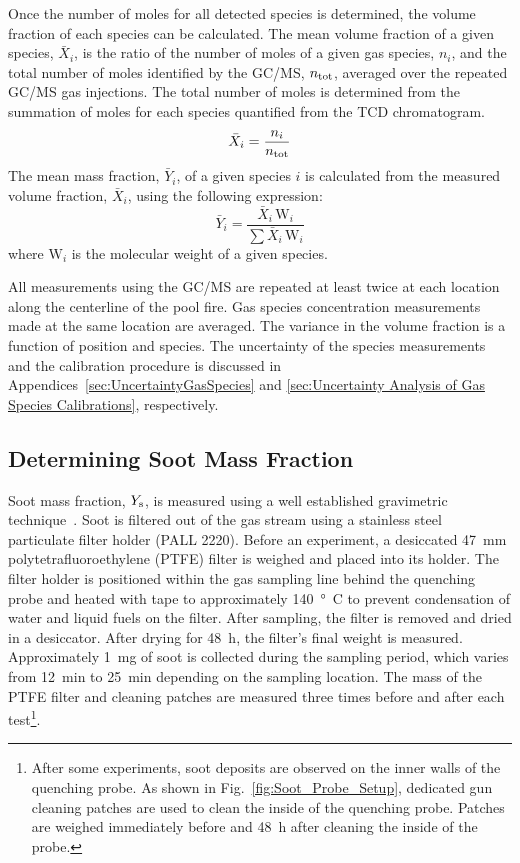 \documentclass[12pt]{article}
\begin{document}
Once the number of moles for all detected species is determined, the volume fraction of each species can be calculated. The mean volume fraction of a given species, $\bar{X}_{i}$, is the ratio of the number of moles of a given gas species, $n_{i}$, and the total number of moles identified by the GC/MS, $n_{\rm tot}$, averaged over the repeated GC/MS gas injections. The total number of moles is determined from the summation of moles for each species quantified from the TCD chromatogram.
\begin{equation}\label{eq:volume_fraction}
  	\bar{X}_{i}= \frac{n_{i}}{n_{\rm tot}}
\end{equation}
The mean mass fraction, $\bar{Y}_{i}$, of a given species $i$ is calculated from the measured volume fraction, $\bar{X}_{i}$, using the following expression:
\begin{equation}\label{eq:mass_fraction}
	\bar{Y}_{i}=\frac{\bar{X}_{i} \, {\textrm{W}_{i}}}{\sum{\bar{X}_{i} \, {\textrm{W}_{i}}}}
\end{equation}
where ${{\textrm{W}_{i}}}$ is the molecular weight of a given species.

All measurements using the GC/MS are repeated at least twice at each location along the centerline of the pool fire. Gas species concentration measurements made at the same location are averaged. The variance in the volume fraction is a function of position and species. The uncertainty of the species measurements and the calibration procedure is discussed in Appendices~\ref{sec:UncertaintyGasSpecies} and \ref{sec:Uncertainty Analysis of Gas Species Calibrations}, respectively.

\subsection{Determining Soot Mass Fraction}
\label{ssec:Soot_Setup}

Soot mass fraction, $Y_{\rm s}$, is measured using a well established gravimetric technique~\cite{Choi1995}. Soot is filtered out of the gas stream using a stainless steel particulate filter holder (PALL 2220).  Before an experiment, a desiccated \SI{47}{mm} polytetrafluoroethylene (PTFE) filter is weighed and placed into its holder. The filter holder is positioned within the gas sampling line behind the quenching probe and heated with tape to approximately \SI{140}{\degree C} to prevent condensation of water and liquid fuels on the filter. After sampling, the filter is removed and dried in a desiccator. After drying for 48~h, the filter’s final weight is measured. Approximately \SI{1}{mg} of soot is collected during the sampling period, which varies from 12~min to 25~min depending on the sampling location. The mass of the PTFE filter and cleaning patches are measured three times before and after each test\footnote{After some experiments, soot deposits are observed on the inner walls of the quenching probe. As shown in Fig.~\ref{fig:Soot_Probe_Setup}, dedicated gun cleaning patches are used to clean the inside of the quenching probe. Patches are weighed immediately before and 48~h after cleaning the inside of the probe.}.
\end{document}
